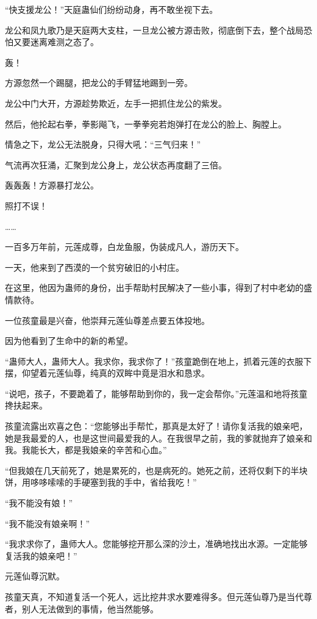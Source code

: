 
\begin{this_body}

“快支援龙公！”天庭蛊仙们纷纷动身，再不敢坐视下去。

龙公和凤九歌乃是天庭两大支柱，一旦龙公被方源击败，彻底倒下去，整个战局恐怕又要迷离难测之态了。

轰！

方源忽然一个踢腿，把龙公的手臂猛地踢到一旁。

龙公中门大开，方源趁势欺近，左手一把抓住龙公的紫发。

然后，他抡起右拳，拳影飚飞，一拳拳宛若炮弹打在龙公的脸上、胸膛上。

情急之下，龙公无法脱身，只得大吼：“三气归来！”

气流再次狂涌，汇聚到龙公身上，龙公状态再度翻了三倍。

轰轰轰！方源暴打龙公。

照打不误！

……

一百多万年前，元莲成尊，白龙鱼服，伪装成凡人，游历天下。

一天，他来到了西漠的一个贫穷破旧的小村庄。

在这里，他因为蛊师的身份，出手帮助村民解决了一些小事，得到了村中老幼的盛情款待。

一位孩童最是兴奋，他崇拜元莲仙尊差点要五体投地。

因为他看到了生命中的新的希望。

“蛊师大人，蛊师大人。我求你，我求你了！”孩童跪倒在地上，抓着元莲的衣服下摆，仰望着元莲仙尊，纯真的双眸中竟是泪水和恳求。

“说吧，孩子，不要跪着了，能够帮助到你的，我一定会帮你。”元莲温和地将孩童搀扶起来。

孩童流露出欢喜之色：“您能够出手帮忙，那真是太好了！请你复活我的娘亲吧，她是我最爱的人，也是这世间最爱我的人。在我很早之前，我的爹就抛弃了娘亲和我。我能长大，都是我娘亲的辛苦和心血。”

“但我娘在几天前死了，她是累死的，也是病死的。她死之前，还将仅剩下的半块饼，用哆哆嗦嗦的手硬塞到我的手中，省给我吃！”

“我不能没有娘！”

“我不能没有娘亲啊！”

“我求求你了，蛊师大人。您能够挖开那么深的沙土，准确地找出水源。一定能够复活我的娘亲吧！”

元莲仙尊沉默。

孩童天真，不知道复活一个死人，远比挖井求水要难得多。但元莲仙尊乃是当代尊者，别人无法做到的事情，他当然能够。


\end{this_body}
